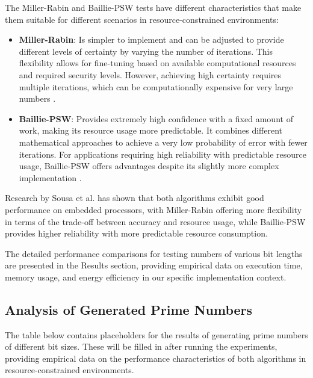 The Miller-Rabin and Baillie-PSW tests have different characteristics that make them suitable for different scenarios in resource-constrained environments:

\begin{itemize}
    \item \textbf{Miller-Rabin}: Is simpler to implement and can be adjusted to provide different levels of certainty by varying the number of iterations. This flexibility allows for fine-tuning based on available computational resources and required security levels. However, achieving high certainty requires multiple iterations, which can be computationally expensive for very large numbers \cite{taxonomy_primality}.
    
    \item \textbf{Baillie-PSW}: Provides extremely high confidence with a fixed amount of work, making its resource usage more predictable. It combines different mathematical approaches to achieve a very low probability of error with fewer iterations. For applications requiring high reliability with predictable resource usage, Baillie-PSW offers advantages despite its slightly more complex implementation \cite{hardware_baillie}.
\end{itemize}

Research by Sousa et al. \cite{taxonomy_primality} has shown that both algorithms exhibit good performance on embedded processors, with Miller-Rabin offering more flexibility in terms of the trade-off between accuracy and resource usage, while Baillie-PSW provides higher reliability with more predictable resource consumption.

The detailed performance comparisons for testing numbers of various bit lengths are presented in the Results section, providing empirical data on execution time, memory usage, and energy efficiency in our specific implementation context.

\subsection{Analysis of Generated Prime Numbers}

The table below contains placeholders for the results of generating prime numbers of different bit sizes. These will be filled in after running the experiments, providing empirical data on the performance characteristics of both algorithms in resource-constrained environments.

